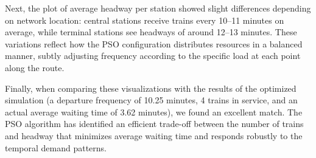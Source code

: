 \documentclass[a4paper,11pt,oneside]{book}
\begin{document}
Next, the plot of average headway per station showed slight differences depending on network location: central stations receive trains every 10–11 minutes on average, while terminal stations see headways of around 12–13 minutes. These variations reflect how the PSO configuration distributes resources in a balanced manner, subtly adjusting frequency according to the specific load at each point along the route.

Finally, when comparing these visualizations with the results of the optimized simulation (a departure frequency of 10.25 minutes, 4 trains in service, and an actual average waiting time of 3.62 minutes), we found an excellent match. The PSO algorithm has identified an efficient trade-off between the number of trains and headway that minimizes average waiting time and responds robustly to the temporal demand patterns.
 

    \begin{appendices}
        
    \end{appendices}
    
\end{document}
